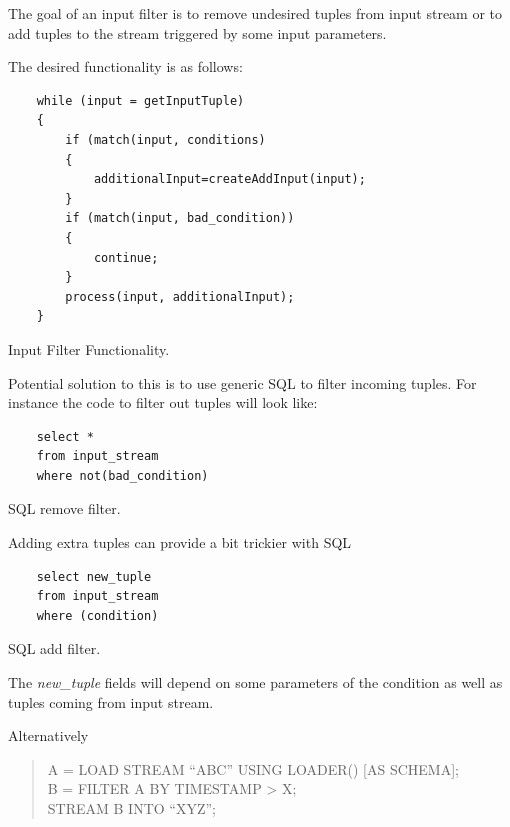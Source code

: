 \documentclass{article}
\begin{document}
The goal of an input filter is to remove undesired tuples from input stream or to add tuples to the stream triggered by some input parameters.

The desired functionality is as follows:

\begin{program}
    \begin{verbatim}   
    while (input = getInputTuple)
    {
        if (match(input, conditions)
        {
            additionalInput=createAddInput(input);
        }
        if (match(input, bad_condition))
        {
            continue;
        }
        process(input, additionalInput);
    }
    \end{verbatim}
\caption{Input Filter Functionality.}
\end{program} 

Potential solution to this is to use generic SQL to filter incoming tuples. For instance the code to filter out tuples will look like:

\begin{program}
    \begin{verbatim}   
    select * 
    from input_stream
    where not(bad_condition)
    \end{verbatim}
\caption{SQL remove filter.}
\end{program}

Adding extra tuples can provide a bit trickier with SQL

\begin{program}
    \begin{verbatim}   
    select new_tuple
    from input_stream
    where (condition)
    \end{verbatim}
\caption{SQL add filter.}
\end{program}

\noindent The \emph{new\_tuple} fields will depend on some parameters of the condition as well as tuples coming from input stream.

Alternatively

\begin{quote}
A = LOAD STREAM {}``ABC'' USING LOADER() {[}AS SCHEMA{]};\\
B = FILTER A BY TIMESTAMP > X;\\
STREAM B INTO {}``XYZ'';
\end{quote}
\end{document}
